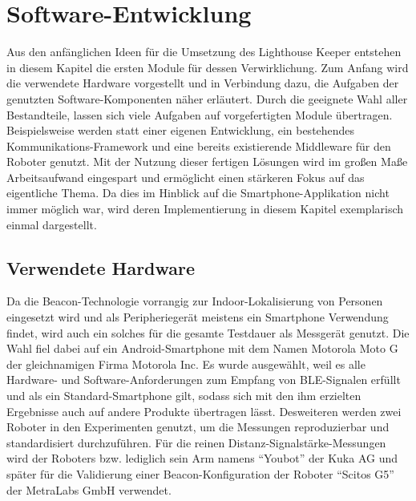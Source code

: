 \chapter{Software-Entwicklung}
Aus den anfänglichen Ideen für die Umsetzung des Lighthouse Keeper entstehen in diesem Kapitel die ersten Module für dessen Verwirklichung. Zum Anfang wird die verwendete Hardware vorgestellt und in Verbindung dazu, die Aufgaben der genutzten Software-Komponenten näher erläutert. Durch die geeignete Wahl aller Bestandteile, lassen sich viele Aufgaben auf vorgefertigten Module übertragen. Beispielsweise werden statt einer eigenen Entwicklung, ein bestehendes Kommunikations-Framework und eine bereits existierende Middleware für den Roboter genutzt. Mit der Nutzung dieser fertigen Lösungen wird im großen Maße Arbeitsaufwand eingespart und ermöglicht einen stärkeren Fokus auf das eigentliche Thema. Da dies im Hinblick auf die Smartphone-Applikation nicht immer möglich war, wird deren Implementierung in diesem Kapitel exemplarisch einmal dargestellt. 
\section{Verwendete Hardware}
Da die Beacon-Technologie vorrangig zur Indoor-Lokalisierung von Personen eingesetzt wird und als Peripheriegerät meistens ein Smartphone Verwendung findet, wird auch ein solches für die gesamte Testdauer als Messgerät genutzt. Die Wahl fiel dabei auf ein Android-Smartphone mit dem Namen Motorola Moto G der gleichnamigen Firma Motorola Inc. Es wurde ausgewählt, weil es alle Hardware- und Software-Anforderungen zum Empfang von BLE-Signalen erfüllt und als ein Standard-Smartphone gilt, sodass sich mit den ihm erzielten Ergebnisse auch auf andere Produkte übertragen lässt. Desweiteren werden zwei Roboter in den Experimenten genutzt, um die Messungen reproduzierbar und standardisiert durchzuführen. Für die reinen Distanz-Signalstärke-Messungen wird der Roboters bzw. lediglich sein Arm namens "`Youbot"' der Kuka AG und später für die Validierung einer Beacon-Konfiguration der Roboter "`Scitos G5"' der MetraLabs GmbH verwendet. 
